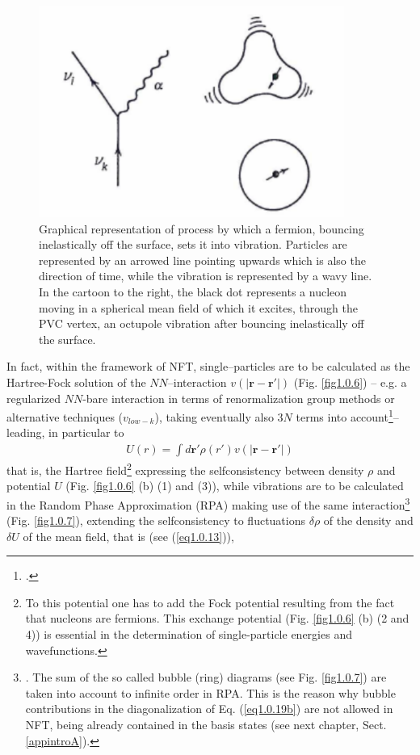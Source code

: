   \begin{figure}
  	\centerline {
  		\includegraphics*[width=10cm]{introduccion/figs/figpreface5}
  	}
  	\caption{Graphical representation of  process       by which a fermion, bouncing inelastically off the surface, sets it into vibration. Particles are represented by an arrowed line pointing upwards which is also the direction of time, while the vibration is represented by a wavy line. In the cartoon to the right, the black dot represents a nucleon moving in a spherical mean field of which it excites, through the PVC vertex, an octupole vibration after bouncing inelastically off the surface.}
  	\label{fig1.0.5}
  \end{figure}
In fact, within the framework of NFT, single--particles are to be calculated as the Hartree-Fock solution of the $NN$--interaction $v(|\mathbf r-\mathbf r'|)$ (Fig. \ref{fig1.0.6}) -- e.g. a regularized $NN$-bare interaction in terms of renormalization group methods or alternative techniques ($v_{low-k}$), taking eventually also 3$N$ terms into account\footnote{\label{f9}\cite{Duguet:13,Duguet:04,Duguet:08,Lesinski:09,Hebeler:09,Baroni:10,Duguet:10,Lesinski:11,Hergert:09}.}-- leading, in particular to
\begin{align}\label{eq1.0.18}
U(r)=\int d\mathbf r' \rho(r')v\left(|\mathbf r-\mathbf r'|\right)
\end{align}
that is, the Hartree field\footnote{To this potential one has to add the Fock potential resulting from the fact that nucleons are fermions. This exchange potential (Fig. \ref{fig1.0.6} (b) (2 and 4)) is essential in the determination of single-particle energies and wavefunctions.} expressing the selfconsistency between density $\rho$ and potential $U$ (Fig. \ref{fig1.0.6} (b) (1) and (3)), while vibrations are to be calculated in the Random Phase Approximation (RPA) making use of the same interaction\footnote{\cite{Bohm:51,Bohm:53}. The sum of the so called bubble (ring) diagrams (see Fig. \ref{fig1.0.7}) are taken into account to infinite order in RPA. This is the reason why bubble contributions in the diagonalization of Eq. (\ref{eq1.0.19b}) are not allowed in NFT, being already contained in the basis states (see next chapter, Sect. \ref{appintroA}).} (Fig. \ref{fig1.0.7}), extending the selfconsistency to fluctuations $\delta\rho$ of the density and $\delta U$ of the mean field, that is (see (\ref{eq1.0.13})),
